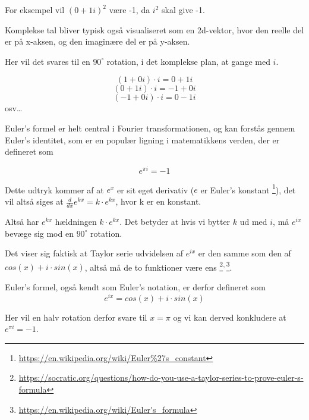 \documentclass[11pt,a4paper]{article}
\begin{document}
For eksempel vil \((0 + 1i)^2\) være -1, da \(i^2\) skal give -1.

Komplekse tal bliver typisk også visualiseret som en 2d-vektor,
hvor den reelle del er på x-aksen, og den imaginære del er på y-aksen.

Her vil det svares til en \(90^\circ\) rotation, i det komplekse plan, at gange med \(i\).

$$
(1 + 0i) \cdot i = 0 + 1i
$$
$$
(0 + 1i) \cdot i = -1 + 0i
$$
$$
(-1 + 0i) \cdot i = 0 - 1i
$$
osv\ldots{}

\newpage

Euler's formel er helt central i Fourier transformationen, og kan forstås gennem Euler's identitet,
som er en populær ligning i matematikkens verden, der er defineret som

$$
e^{\pi i} = -1
$$

Dette udtryk kommer af at \(e^x\) er sit eget derivativ (\(e\) er Euler's konstant \footnote{\url{https://en.wikipedia.org/wiki/Euler\%27s\_constant}}),
det vil altså siges at \(\frac{d}{dx}e^{kx} = k\cdot e^{kx}\), hvor k er en konstant.

Altså har \(e^{kx}\) hældningen \(k \cdot e^{kx}\).
Det betyder at hvis vi bytter \(k\) ud med \(i\), må \(e^{ix}\) bevæge sig mod en \(90^\circ\) rotation.

\bigskip

Det viser sig faktisk at Taylor serie udvidelsen af \(e^{ix}\) er den samme som den af \(cos(x) + i \cdot sin(x)\),
altså må de to funktioner være ens \footnote{\url{https://socratic.org/questions/how-do-you-use-a-taylor-series-to-prove-euler-s-formula}}\textsuperscript{,}\,\footnote{\url{https://en.wikipedia.org/wiki/Euler's\_formula}}.

Euler's formel, også kendt som Euler's notation, er derfor defineret som
$$
e^{ix} = cos(x) + i \cdot sin(x)
$$

Her vil en halv rotation derfor svare til \(x=\pi\) og vi kan derved konkludere at \(e^{\pi i} = -1\).
\end{document}
